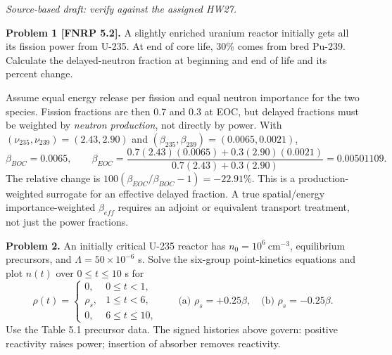 \noindent\textit{Source-based draft: verify against the assigned HW27.}

\medskip
\noindent\textbf{Problem 1 [FNRP 5.2].}
A slightly enriched uranium reactor initially gets all its fission power
from U-235. At end of core life, 30\% comes from bred Pu-239. Calculate
the delayed-neutron fraction at beginning and end of life and its percent change.

\begin{adaptedsolution}
Assume equal energy release per fission and equal neutron importance for
the two species. Fission fractions are then 0.7 and 0.3 at EOC, but delayed
fractions must be weighted by \emph{neutron production}, not directly by power.
With $(\nu_{235},\nu_{239})=(2.43,2.90)$ and
$(\beta_{235},\beta_{239})=(0.0065,0.0021)$,
\[
\boxed{\beta_{BOC}=0.0065},\qquad
\boxed{\beta_{EOC}=
\frac{0.7(2.43)(0.0065)+0.3(2.90)(0.0021)}{0.7(2.43)+0.3(2.90)}
=0.00501109}.
\]
The relative change is
$\boxed{100(\beta_{EOC}/\beta_{BOC}-1)=-22.91\%}$.
This is a production-weighted surrogate for an effective delayed fraction.
A true spatial/energy importance-weighted $\beta_{eff}$ requires an adjoint
or equivalent transport treatment, not just the power fractions.
\end{adaptedsolution}

\newpage
\noindent\textbf{Problem 2.}
An initially critical U-235 reactor has $n_0=10^6~\mathrm{cm^{-3}}$,
equilibrium precursors, and $\Lambda=50\times10^{-6}$ s. Solve the six-group
point-kinetics equations and plot $n(t)$ over $0\le t\le10$ s for
\[
\rho(t)=\begin{cases}
0,&0\le t<1,\\
\rho_s,&1\le t<6,\\
0,&6\le t\le10,
\end{cases}\qquad
\text{(a) }\rho_s=+0.25\beta,\quad\text{(b) }\rho_s=-0.25\beta.
\]
Use the Table 5.1 precursor data. The signed histories above govern:
positive reactivity raises power; insertion of absorber removes reactivity.

